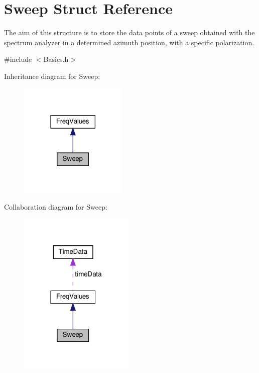 \hypertarget{structSweep}{}\section{Sweep Struct Reference}
\label{structSweep}


The aim of this structure is to store the data points of a sweep obtained with the spectrum analyzer in a determined azimuth position, with a specific polarization.  




{\ttfamily \#include $<$Basics.\+h$>$}



Inheritance diagram for Sweep\+:\nopagebreak
\begin{figure}[H]
\begin{center}
\leavevmode
\includegraphics[width=146pt]{structSweep__inherit__graph}
\end{center}
\end{figure}


Collaboration diagram for Sweep\+:\nopagebreak
\begin{figure}[H]
\begin{center}
\leavevmode
\includegraphics[width=156pt]{structSweep__coll__graph}
\end{center}
\end{figure}
